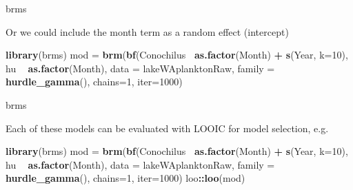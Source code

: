 \documentclass[ignorenonframetext,]{beamer}
\newenvironment{Shaded}{\begin{snugshade}}{\end{snugshade}}
\newcommand{\KeywordTok}[1]{\textcolor[rgb]{0.13,0.29,0.53}{\textbf{#1}}}
\newcommand{\DataTypeTok}[1]{\textcolor[rgb]{0.13,0.29,0.53}{#1}}
\newcommand{\DecValTok}[1]{\textcolor[rgb]{0.00,0.00,0.81}{#1}}
\newcommand{\StringTok}[1]{\textcolor[rgb]{0.31,0.60,0.02}{#1}}
\newcommand{\OperatorTok}[1]{\textcolor[rgb]{0.81,0.36,0.00}{\textbf{#1}}}
\newcommand{\NormalTok}[1]{#1}
\begin{document}
\begin{frame}[fragile]{brms}

Or we could include the month term as a random effect (intercept)

\begin{Shaded}
\begin{Highlighting}[]
\KeywordTok{library}\NormalTok{(brms)}
\NormalTok{mod =}\StringTok{ }\KeywordTok{brm}\NormalTok{(}\KeywordTok{bf}\NormalTok{(Conochilus}\OperatorTok{~}\StringTok{ }\KeywordTok{as.factor}\NormalTok{(Month) }\OperatorTok{+}\StringTok{ }\KeywordTok{s}\NormalTok{(Year, }\DataTypeTok{k=}\DecValTok{10}\NormalTok{), }
\NormalTok{       hu }\OperatorTok{~}\StringTok{ }\KeywordTok{as.factor}\NormalTok{(Month), }
      \DataTypeTok{data =}\NormalTok{ lakeWAplanktonRaw, }\DataTypeTok{family =} \KeywordTok{hurdle_gamma}\NormalTok{(), }
        \DataTypeTok{chains=}\DecValTok{1}\NormalTok{, }\DataTypeTok{iter=}\DecValTok{1000}\NormalTok{)}
\end{Highlighting}
\end{Shaded}

\end{frame}

\begin{frame}[fragile]{brms}

Each of these models can be evaluated with LOOIC for model selection,
e.g.

\begin{Shaded}
\begin{Highlighting}[]
\KeywordTok{library}\NormalTok{(brms)}
\NormalTok{mod =}\StringTok{ }\KeywordTok{brm}\NormalTok{(}\KeywordTok{bf}\NormalTok{(Conochilus}\OperatorTok{~}\StringTok{ }\KeywordTok{as.factor}\NormalTok{(Month) }\OperatorTok{+}\StringTok{ }\KeywordTok{s}\NormalTok{(Year, }\DataTypeTok{k=}\DecValTok{10}\NormalTok{), }
\NormalTok{       hu }\OperatorTok{~}\StringTok{ }\KeywordTok{as.factor}\NormalTok{(Month), }
      \DataTypeTok{data =}\NormalTok{ lakeWAplanktonRaw, }\DataTypeTok{family =} \KeywordTok{hurdle_gamma}\NormalTok{(), }
        \DataTypeTok{chains=}\DecValTok{1}\NormalTok{, }\DataTypeTok{iter=}\DecValTok{1000}\NormalTok{)}
\NormalTok{loo}\OperatorTok{::}\KeywordTok{loo}\NormalTok{(mod)}
\end{Highlighting}
\end{Shaded}

\end{frame}
\end{document}

